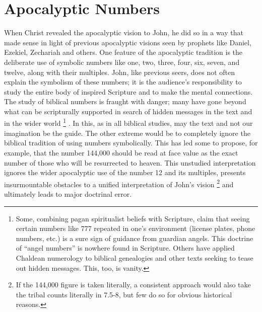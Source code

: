 \backmatter
\appendix
\appendixpage
\onecolumn
\setcounter{footnote}{0}
\chapter*{Apocalyptic Numbers}

When Christ revealed the apocalyptic vision to John, he did so in a way that made sense in light of previous 
apocalyptic visions seen by prophets like Daniel, Ezekiel, Zechariah and others. One feature of the apocalyptic 
tradition is the deliberate use of symbolic numbers like one, two, three, four, six, seven, and twelve, along with their multiples. 
John, like previous seers, does not often explain the symbolism of these numbers; it is the audience's 
responsibility to study the entire body of inspired Scripture and to make the mental connections. 
\newline\newline
The study of biblical numbers is fraught with danger; many have gone beyond what can be scripturally supported in search of hidden messages in the text and in the wider world%
\footnote{Some, combining pagan spiritualist beliefs with Scripture, claim that seeing certain numbers like 777 repeated in one's environment (license plates, phone numbers, etc.) is a sure sign of guidance from guardian angels. This doctrine of ``angel numbers'' is nowhere found in Scripture. Others have applied Chaldean numerology to biblical genealogies and other texts seeking to tease out hidden messages. This, too, is vanity.}%
. In this, as in all biblical studies, may the text and not our imagination be the guide. The other extreme would be to completely ignore the biblical tradition of using numbers symbolically. This has led some to propose, for example, that the number 144,000 should be read at face value as the exact number of those who will be resurrected to heaven. This unstudied interpretation ignores the wider apocalyptic use of the number 12 and its multiples, presents insurmountable obstacles to a unified interpretation of John's vision%
\footnote{If the 144,000 figure is taken literally, a consistent approach would also take the tribal counts literally in 7.5-8, but few do so for obvious historical reasons.} %
and ultimately leads to major doctrinal error.
\newline\newline
